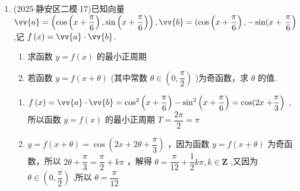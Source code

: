 \begin{enumerate}
    \item (2025$\cdot$静安区二模$\cdot$17)已知向量 $\vv{a} = \left( {\cos \left( {x + \dfrac{\pi }{6}}\right) ,\sin \left( {x + \dfrac{\pi }{6}}\right) }\right) ,\vv{b} = (\cos \left( {x + \dfrac{\pi }{6}}\right) , - \sin (x +  \left. \dfrac{\pi }{6}\right)$ ,记 $f\left( x\right)  = \vv{a} \cdot  \vv{b}$.
    \begin{enumerate}
        \item 求函数 $y = f\left( x\right)$ 的最小正周期
        \item 若函数 $y = f\left( {x + \theta }\right)$ (其中常数 $\theta  \in  \left( {0,\dfrac{\pi }{2}}\right)$ )为奇函数，求 $\theta$ 的值.
    \end{enumerate} 
    \begin{jieda}
        \begin{enumerate}
            \item $f\left( x\right)  = \vv{a} \cdot  \vv{b} = {\cos }^{2}\left( {x + \dfrac{\pi }{6}}\right)  - {\sin }^{2}\left( {x + \dfrac{\pi }{6}}\right)  = \cos ({2x}  \left. {+\dfrac{\pi }{3}}\right)$ ,所以函数 $y = f\left( x\right)$ 的最小正周期 $T = \dfrac{2\pi }{2} = \pi$
            \item $y = f\left( {x + \theta }\right)  = \cos \left( {{2x} + {2\theta } + \dfrac{\pi }{3}}\right)$ ，因为函数 $y = f\left( {x + \theta }\right)$ 为奇函数，所以 ${2\theta } + \dfrac{\pi }{3} = \dfrac{\pi }{2} + {k\pi }$ ，解得 $\theta  = \dfrac{\pi }{12} + \dfrac{1}{2}{k\pi },k \in  \mathbf{Z}$ ,又因为 $\theta  \in  \left( {0,\dfrac{\pi }{2}}\right)$ ,所以 $\theta  = \dfrac{\pi }{12}$
        \end{enumerate}
    \end{jieda}
    

\end{enumerate}

